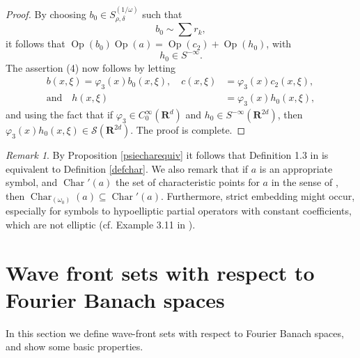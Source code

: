 \documentclass[12pt,a4paper,reqno]{amsart}
\numberwithin{equation}{section}
\numberwithin{thm}{section}
\theoremstyle{definition}
\theoremstyle{remark}
\newtheorem{rem}[thm]{Remark}
\begin{document}
\begin{proof}
\par

By choosing $b_0\in S ^{(1/\omega )}_{\rho,\delta}$ such that
$$
b_0\sim \sum r_k,
$$
it follows that ${\operatorname{Op}} (b_0){\operatorname{Op}} (a) ={\operatorname{Op}} (c_2)+{\operatorname{Op}} (h_0)$, with
$$
h_0\in S ^{-\infty}.
$$
The assertion (4) now follows by letting
\begin{align*}
b(x,\xi )={\varphi} _3(x)b_0(x,\xi ),\quad  c(x,\xi ) &= {\varphi} _3(x)c_2(x,\xi ),
\\[1ex]
\text{and}\quad h(x,\xi ) &= {\varphi} _3(x) h_0(x,\xi ),
\end{align*}
and using the fact that if ${\varphi} _3 \in C_0^\infty ({\mathbf R^{d}})$ and $h_0\in
S^{-\infty}({\mathbf R^{{2d}}})$, then ${\varphi} _3 (x)h_0(x,\xi )\in \mathscr S({\mathbf R^{{2d}}})$.
The proof is complete.
\end{proof}

\par

\begin{rem}\label{compchar}
By Proposition \ref{psiecharequiv} it follows that Definition 1.3 in
\cite {PTT1} is equivalent to Definition \ref{defchar}. We also remark
that if $a$ is an appropriate symbol, and ${\operatorname{Char}} '(a)$ the set of
characteristic points for $a$ in the sense of \cite[Definition
18.1.5]{Ho1}, then ${\operatorname{Char}} _{(\omega _0)}(a)\subseteq {\operatorname{Char}}
'(a)$. Furthermore, strict embedding might occur, especially for
symbols to hypoelliptic partial operators with constant coefficients, which are not elliptic (cf.  Example 3.11 in \cite{PTT1}).
\end{rem}

\par

\section{Wave front sets with respect to Fourier
Banach spaces}\label{sec3}

\par

In this section we define wave-front sets with respect to Fourier
Banach spaces, and show some basic properties. 

\par
\end{document}
